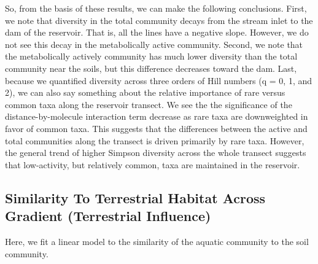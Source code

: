 \documentclass[]{article}
\begin{document}
So, from the basis of these results, we can make the following
conclusions. First, we note that diversity in the total community decays
from the stream inlet to the dam of the reservoir. That is, all the
lines have a negative slope. However, we do not see this decay in the
metabolically active community. Second, we note that the metabolically
actively community has much lower diversity than the total community
near the soils, but this difference decreases toward the dam. Last,
because we quantified diversity across three orders of Hill numbers (q =
0, 1, and 2), we can also say something about the relative importance of
rare versus common taxa along the reservoir transect. We see the the
significance of the distance-by-molecule interaction term decrease as
rare taxa are downweighted in favor of common taxa. This suggests that
the differences between the active and total communities along the
transect is driven primarily by rare taxa. However, the general trend of
higher Simpson diversity across the whole transect suggests that
low-activity, but relatively common, taxa are maintained in the
reservoir.

\subsection{Similarity To Terrestrial Habitat Across Gradient
(Terrestrial
Influence)}\label{similarity-to-terrestrial-habitat-across-gradient-terrestrial-influence}

Here, we fit a linear model to the similarity of the aquatic community
to the soil community.
\end{document}

